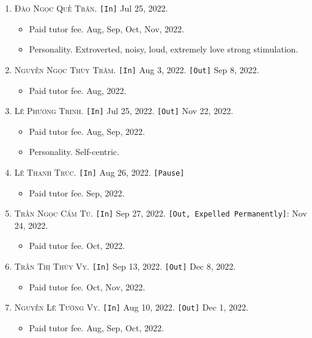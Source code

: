 \documentclass{article}
\numberwithin{equation}{section}
\begin{document}
\begin{enumerate}
	\item \textsc{Đào Ngọc Quế Trân.} \texttt{[In]} Jul 25, 2022.
	\begin{itemize}
		\item \textsf{Paid tutor fee.} Aug, Sep, Oct, Nov, 2022.
		\item \textsf{Personality.} Extroverted, noisy, loud, extremely love strong stimulation.
	\end{itemize}
	\item \textsc{Nguyễn Ngọc Thùy Trâm.} \texttt{[In]} Aug 3, 2022. \texttt{[Out]} Sep 8, 2022.
	\begin{itemize}
		\item \textsf{Paid tutor fee.} Aug, 2022.
	\end{itemize}
	\item \textsc{Lê Phương Trinh.} \texttt{[In]} Jul 25, 2022. \texttt{[Out]} Nov 22, 2022.
	\begin{itemize}
		\item \textsf{Paid tutor fee.} Aug, Sep, 2022.
		\item \textsf{Personality.} Self-centric.
	\end{itemize}
	\item \textsc{Lê Thanh Trúc.} \texttt{[In]} Aug 26, 2022. \texttt{[Pause]}
	\begin{itemize}
		\item \textsf{Paid tutor fee.} Sep, 2022.
	\end{itemize}
	\item \textsc{Trần Ngọc Cẩm Tú.} \texttt{[In]} Sep 27, 2022. \texttt{[Out, Expelled Permanently]}: Nov 24, 2022.
	\begin{itemize}
		\item \textsf{Paid tutor fee.} Oct, 2022.
	\end{itemize}
	\item \textsc{Trần Thị Thúy Vy.} \texttt{[In]} Sep 13, 2022. \texttt{[Out]} Dec 8, 2022.
	\begin{itemize}
		\item \textsf{Paid tutor fee.} Oct, Nov, 2022.
	\end{itemize}
	\item \textsc{Nguyễn Lê Tường Vy.} \texttt{[In]} Aug 10, 2022. \texttt{[Out]} Dec 1, 2022.
	\begin{itemize}
		\item \textsf{Paid tutor fee.} Aug, Sep, Oct, 2022.
	\end{itemize}
\end{enumerate}
\end{document}
